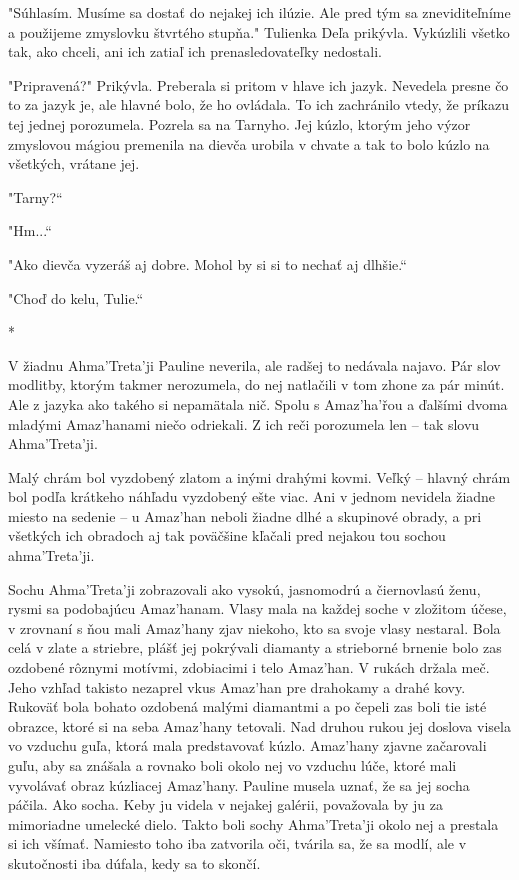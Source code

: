 \documentclass{book}
\begin{document}
"$ $Súhlasím. Musíme sa dostať do nejakej ich ilúzie. Ale pred tým sa zneviditeľníme a použijeme zmyslovku štvrtého stupňa."$ $ Tulienka Deľa prikývla. Vykúzlili všetko tak, ako chceli, ani ich zatiaľ ich prenasledovateľky nedostali.

"$ $Pripravená?"$ $ Prikývla. Preberala si pritom v hlave ich jazyk. Nevedela presne čo to za jazyk je, ale hlavné bolo, že ho ovládala. To ich zachránilo vtedy, že príkazu tej jednej porozumela. Pozrela sa na Tarnyho. Jej kúzlo, ktorým jeho výzor zmyslovou mágiou premenila na dievča urobila v chvate a tak to bolo kúzlo na všetkých, vrátane jej.

"$ $Tarny?“

"$ $Hm...“

"$ $Ako dievča vyzeráš aj dobre. Mohol by si si to nechať aj dlhšie.“

"$ $Choď do kelu, Tulie.“

\begin{center}
*
\end{center}

V žiadnu Ahma'Treta'ji Pauline neverila, ale radšej to nedávala najavo. Pár slov modlitby, ktorým takmer nerozumela, do nej natlačili v tom zhone za pár minút. Ale z jazyka ako takého si nepamätala nič. Spolu s Amaz'ha'r\v{}ou a ďalšími dvoma mladými Amaz'hanami niečo odriekali. Z ich reči porozumela len – tak slovu Ahma'Treta'ji.

Malý chrám bol vyzdobený zlatom a inými drahými kovmi. Veľký – hlavný chrám bol podľa krátkeho náhľadu vyzdobený ešte viac. Ani v jednom nevidela žiadne miesto na sedenie – u Amaz'han neboli žiadne dlhé a skupinové obrady, a pri všetkých ich obradoch aj tak poväčšine kľačali pred nejakou tou sochou ahma'Treta'ji.

Sochu Ahma'Treta'ji zobrazovali ako vysokú, jasnomodrú a čiernovlasú ženu, rysmi sa podobajúcu Amaz'hanam. Vlasy mala na každej soche v zložitom účese, v zrovnaní s ňou mali Amaz'hany zjav niekoho, kto sa svoje vlasy nestaral. Bola celá v zlate a striebre, plášť jej pokrývali diamanty a strieborné brnenie bolo zas ozdobené rôznymi motívmi, zdobiacimi i telo Amaz'han. V rukách držala meč. Jeho vzhľad takisto nezaprel vkus Amaz'han pre drahokamy a drahé kovy. Rukoväť bola bohato ozdobená malými diamantmi a po čepeli zas boli tie isté obrazce, ktoré si na seba Amaz'hany tetovali. Nad druhou rukou jej doslova visela vo vzduchu guľa, ktorá mala predstavovať kúzlo. Amaz'hany zjavne začarovali guľu, aby sa znášala a rovnako boli okolo nej vo vzduchu lúče, ktoré mali vyvolávať obraz kúzliacej Amaz'hany. Pauline musela uznať, že sa jej socha páčila. Ako socha. Keby ju videla v nejakej galérii, považovala by ju za mimoriadne umelecké dielo. Takto boli sochy Ahma'Treta'ji okolo nej a prestala si ich všímať. Namiesto toho iba zatvorila oči, tvárila sa, že sa modlí, ale v skutočnosti iba dúfala, kedy sa to skončí.
\end{document}
